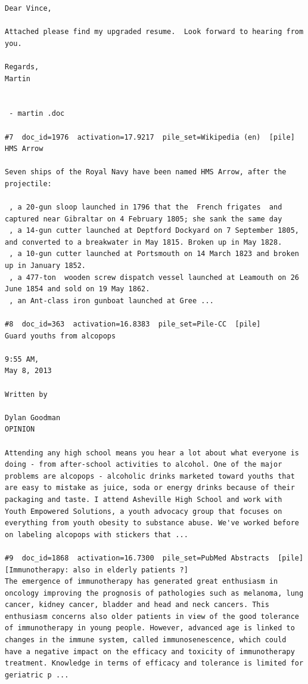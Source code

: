 \begin{verbatim}
Dear Vince,

Attached please find my upgraded resume.  Look forward to hearing from you.

Regards,
Martin


 - martin .doc

#7  doc_id=1976  activation=17.9217  pile_set=Wikipedia (en)  [pile]
HMS Arrow

Seven ships of the Royal Navy have been named HMS Arrow, after the projectile:

 , a 20-gun sloop launched in 1796 that the  French frigates  and  captured near Gibraltar on 4 February 1805; she sank the same day
 , a 14-gun cutter launched at Deptford Dockyard on 7 September 1805, and converted to a breakwater in May 1815. Broken up in May 1828.
 , a 10-gun cutter launched at Portsmouth on 14 March 1823 and broken up in January 1852.
 , a 477-ton  wooden screw dispatch vessel launched at Leamouth on 26 June 1854 and sold on 19 May 1862.
 , an Ant-class iron gunboat launched at Gree ...

#8  doc_id=363  activation=16.8383  pile_set=Pile-CC  [pile]
Guard youths from alcopops

9:55 AM,
May 8, 2013

Written by

Dylan Goodman
OPINION

Attending any high school means you hear a lot about what everyone is doing - from after-school activities to alcohol. One of the major problems are alcopops - alcoholic drinks marketed toward youths that are easy to mistake as juice, soda or energy drinks because of their packaging and taste. I attend Asheville High School and work with Youth Empowered Solutions, a youth advocacy group that focuses on everything from youth obesity to substance abuse. We've worked before on labeling alcopops with stickers that ...

#9  doc_id=1868  activation=16.7300  pile_set=PubMed Abstracts  [pile]
[Immunotherapy: also in elderly patients ?]
The emergence of immunotherapy has generated great enthusiasm in oncology improving the prognosis of pathologies such as melanoma, lung cancer, kidney cancer, bladder and head and neck cancers. This enthusiasm concerns also older patients in view of the good tolerance of immunotherapy in young people. However, advanced age is linked to changes in the immune system, called immunosenescence, which could have a negative impact on the efficacy and toxicity of immunotherapy treatment. Knowledge in terms of efficacy and tolerance is limited for geriatric p ...


\end{verbatim}
